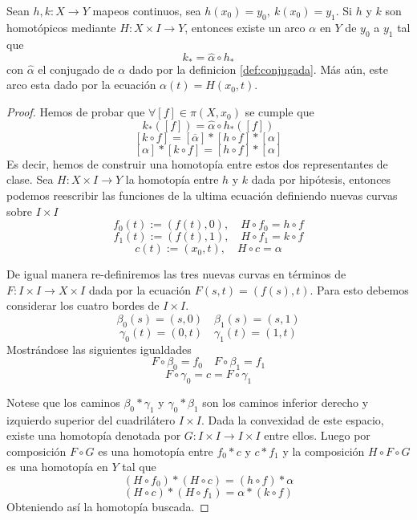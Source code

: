 \begin{lema} \label{lem:equiv-hom-lift}
  Sean \(h,k : X \to Y\) mapeos continuos, sea \(h (x_0) = y_0,\ k(x_0)
  = y_1\). Si \(h\) y \(k\) son homotópicos mediante \(H : X \times I
  \to Y\), entonces existe un arco \(\alpha\) en \(Y\) de \(y_0\) a
  \(y_1\) tal que
  \[k_* = \hat \alpha \circ h_* \]
  con \(\hat \alpha\) el conjugado de \(\alpha\) dado por la definicion
  \ref{def:conjugada}. Más aún, este arco esta dado por la ecuación
  \(\alpha (t) = H (x_0, t)\).
\end{lema}
\begin{proof}
  Hemos de probar que \(\forall [f] \in \pi (X, x_0)\) se cumple que
  \[ k_* ([f]) = \hat \alpha \circ h_* ([f]) \]
  \[ [k \circ f] = [ \overline{\alpha} ] *  [h \circ f] * [\alpha] \]
  \[ [ \alpha ] * [k \circ f] =  [h \circ f] * [\alpha] \]
  Es decir, hemos de construir una homotopía entre estos dos
  representantes de clase. Sea \(H : X \times I \to Y\) la homotopía
  entre \(h\) y \(k\) dada por hipótesis, entonces podemos reescribir
  las funciones de la ultima ecuación definiendo nuevas curvas sobre \(I
  \times I\)
  \[ f_0(t) := \left( f(t), 0 \right), \quad H \circ f_0 = h \circ f \]
  \[ f_1(t) := \left( f(t), 1 \right), \quad H \circ f_1 = k \circ f \]
  \[ c(t) := (x_0, t), \quad H \circ c = \alpha \]

  De igual manera re-definiremos las tres nuevas curvas en términos de
  \(F : I \times I \to X \times I\) dada por la ecuación \(F(s,t) =
  (f(s),t)\). Para esto debemos considerar los cuatro bordes de
  \(I \times I\).
  \[ \beta_0(s) = (s, 0) \quad \beta_1(s) = (s, 1)\]
  \[ \gamma_0(t) = (0, t) \quad \gamma_1(t) = (1, t)\]
  Mostrándose las siguientes igualdades
  \[ F \circ \beta_0 = f_0 \quad F \circ \beta_1 = f_1\]
  \[ F \circ \gamma_0 = c = F \circ \gamma_1 \]

  Notese que los caminos \(\beta_0 * \gamma_1\) y \(\gamma_0 * \beta_1\)
  son los caminos inferior derecho y izquierdo superior del cuadrilátero
  \(I \times I\). Dada la convexidad de este espacio, existe una
  homotopía denotada por \(G : I \times I \to I \times I \) entre ellos.
  Luego por composición \(F \circ G\) es una homotopía entre \(f_0 * c\) y
  \(c * f_1\) y la composición \(H \circ F \circ G\) es una homotopía en
  \(Y\) tal que
  \[ (H \circ f_0) * (H \circ c) = (h \circ f) * \alpha \]
  \[ (H \circ c) * (H \circ f_1) = \alpha * (k \circ f) \]
  Obteniendo así la homotopía buscada.
\end{proof}

